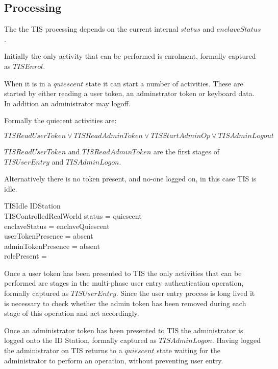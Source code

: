 \subsection{Processing}

The the TIS processing depends on the current internal $status$ and $enclaveStatus$. 

Initially the only activity that can be performed is enrolment,
formally captured as
$TISEnrol$.

When it is in a $quiescent$ state it can start a number of activities. These
are started by either reading a user token, an adminstrator token or
keyboard data. In addition an administrator may logoff.

Formally the quiecent activities are:

\[
        TISReadUserToken \lor TISReadAdminToken \lor TISStartAdminOp
\lor TISAdminLogout
\]
\begin{Zcomment}
\item
$TISReadUserToken$ and $TISReadAdminToken$ are the first stages of
$TISUserEntry$ and $TISAdminLogon$.
\end{Zcomment}
Alternatively there is no token present, and no-one logged on, in this
case TIS is idle.

\begin{schema}{TISIdle}
        \Xi IDStation
\\      \Xi TISControlledRealWorld
\where
        status = quiescent
\\      enclaveStatus = enclaveQuiescent
\\      userTokenPresence = absent
\\      adminTokenPresence = absent
\\      rolePresent = \Nil
\end{schema}

Once a user token has been presented to TIS the only activities
that can be performed are stages in the multi-phase user entry
authentication operation, formally captured as $TISUserEntry$. Since
the user entry process is long lived it is necessary to check whether
the admin token has been removed during each stage of this operation
and act accordingly.

Once an administrator token has been presented to TIS the
administrator is logged onto the ID Station, formally captured as
$TISAdminLogon$. Having logged the administrator on TIS returns to a
$quiescent$ state waiting for the administrator to perform an
operation, without preventing user entry.

